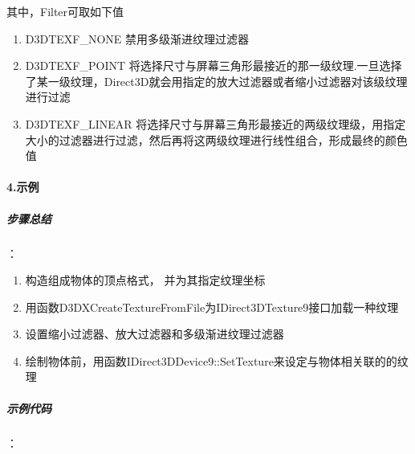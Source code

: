 \documentclass[UTF8,a4paper,8pt]{ctexart}
\begin{document}
				  其中，Filter可取如下值
				  \begin{enumerate}[fullwidth, itemindent = 3em]
				  	\item  D3DTEXF\_NONE   禁用多级渐进纹理过滤器
				  	\item  D3DTEXF\_POINT  将选择尺寸与屏幕三角形最接近的那一级纹理.一旦选择了某一级纹理，Direct3D就会用指定的放大过滤器或者缩小过滤器对该级纹理进行过滤
				  	\item  D3DTEXF\_LINEAR 将选择尺寸与屏幕三角形最接近的两级纹理级，用指定大小的过滤器进行过滤，然后再将这两级纹理进行线性组合，形成最终的颜色值
				  \end{enumerate}
	\paragraph{4.示例}
			\subparagraph{步骤总结}：
				\begin{enumerate}
					\item 构造组成物体的顶点格式， 并为其指定纹理坐标 
					\item 用函数D3DXCreateTextureFromFile为IDirect3DTexture9接口加载一种纹理
					\item 设置缩小过滤器、放大过滤器和多级渐进纹理过滤器
					\item 绘制物体前，用函数IDirect3DDevice9::SetTexture来设定与物体相关联的的纹理
				\end{enumerate}
			\subparagraph{示例代码}：
\end{document}
